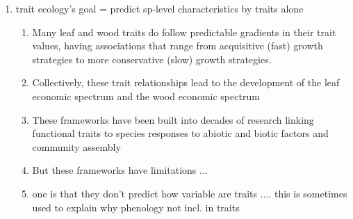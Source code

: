 \documentclass{article}
\begin{document}
\begin{enumerate}

\item trait ecology’s goal = predict sp-level characteristics by traits alone %
\begin{enumerate}
\item Many leaf and wood traits do follow predictable gradients in their trait values, having associations that range from acquisitive (fast) growth strategies to more conservative (slow) growth strategies.
\item Collectively, these trait relationships lead to the development of the leaf economic spectrum and the wood economic spectrum
\item These frameworks have been built into decades of research linking functional traits to species responses to abiotic and biotic factors and community assembly
\item But these frameworks have limitations ... 
\item one is that they don't predict how variable are traits .... this is sometimes used to explain why phenology not incl. in traits %
\end{enumerate}


\end{enumerate}
\end{document}
